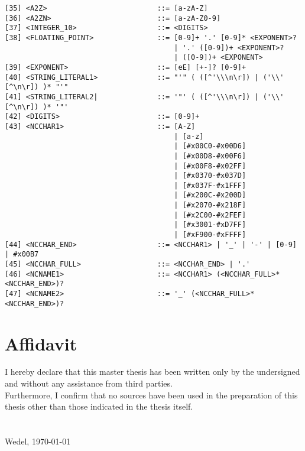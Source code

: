 \documentclass[11pt,a4paper,headsepline, bibtotoc]{scrreprt}
\begin{document}
\begin{verbatim}
[35] <A2Z>                          ::= [a-zA-Z]
[36] <A2ZN>                         ::= [a-zA-Z0-9]
[37] <INTEGER_10>                   ::= <DIGITS>
[38] <FLOATING_POINT>               ::= [0-9]+ '.' [0-9]* <EXPONENT>? 
                                        | '.' ([0-9])+ <EXPONENT>?
                                        | ([0-9])+ <EXPONENT>
[39] <EXPONENT>                     ::= [eE] [+-]? [0-9]+
[40] <STRING_LITERAL1>              ::= "'" ( ([^'\\\n\r]) | ('\\' [^\n\r]) )* "'"
[41] <STRING_LITERAL2|              ::= '"' ( ([^'\\\n\r]) | ('\\' [^\n\r]) )* '"'
[42] <DIGITS>                       ::= [0-9]+
[43] <NCCHAR1>                      ::= [A-Z]
                                        | [a-z]
                                        | [#x00C0-#x00D6]
                                        | [#x00D8-#x00F6]
                                        | [#x00F8-#x02FF]
                                        | [#x0370-#x037D]
                                        | [#x037F-#x1FFF]
                                        | [#x200C-#x200D]
                                        | [#x2070-#x218F]
                                        | [#x2C00-#x2FEF]
                                        | [#x3001-#xD7FF]
                                        | [#xF900-#xFFFF]
[44] <NCCHAR_END>                   ::= <NCCHAR1> | '_' | '-' | [0-9] | #x00B7
[45] <NCCHAR_FULL>                  ::= <NCCHAR_END> | '.'
[46] <NCNAME1>                      ::= <NCCHAR1> (<NCCHAR_FULL>* <NCCHAR_END>)?
[47] <NCNAME2>                      ::= '_' (<NCCHAR_FULL>* <NCCHAR_END>)?
\end{verbatim}

\chapter{Affidavit}
I hereby declare that this master thesis has been written only by the undersigned and without any assistance from third parties.\\
Furthermore, I confirm that no sources have been used in the preparation of this thesis other than those indicated in the thesis itself.\\
\\
\\
Wedel, \today 
\\
\\
\end{document}
